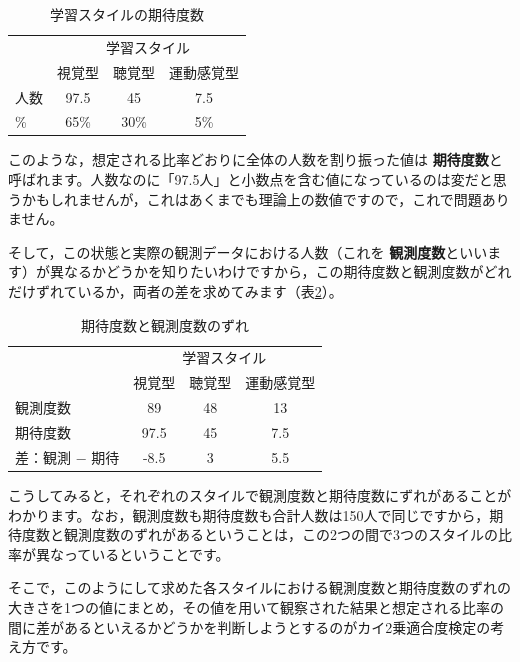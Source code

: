 \documentclass[
  12pt,
  a5jpaper,
  lualatex, ja=standard]{bxjsbook}
\renewcommand{\emph}[1]{\textbf{\color{emph} #1}}
\begin{document}
\begin{table}[H]

\caption{\label{tab:frequencies-chisq-table2}学習スタイルの期待度数}
\centering
\begin{tabular}[t]{lccc}
\toprule
\multicolumn{1}{c}{ } & \multicolumn{3}{c}{学習スタイル} \\
\cmidrule(l{3pt}r{3pt}){2-4}
  & 視覚型 & 聴覚型 & 運動感覚型\\
\midrule
人数 & 97.5 & 45 & 7.5\\
\% & 65\% & 30\% & 5\%\\
\bottomrule
\end{tabular}
\end{table}

このような，想定される比率どおりに全体の人数を割り振った値は\emph{期待度数}と呼ばれます。人数なのに「97.5人」と小数点を含む値になっているのは変だと思うかもしれませんが，これはあくまでも理論上の数値ですので，これで問題ありません。

そして，この状態と実際の観測データにおける人数（これを\emph{観測度数}といいます）が異なるかどうかを知りたいわけですから，この期待度数と観測度数がどれだけずれているか，両者の差を求めてみます（表\ref{tab:frequencies-chisq-table3}）。

\begin{table}[H]

\caption{\label{tab:frequencies-chisq-table3}期待度数と観測度数のずれ}
\centering
\begin{tabular}[t]{lccc}
\toprule
\multicolumn{1}{c}{ } & \multicolumn{3}{c}{学習スタイル} \\
\cmidrule(l{3pt}r{3pt}){2-4}
  & 視覚型 & 聴覚型 & 運動感覚型\\
\midrule
観測度数 & 89 & 48 & 13\\
期待度数 & 97.5 & 45 & 7.5\\
差：観測 − 期待 & -8.5 & 3 & 5.5\\
\bottomrule
\end{tabular}
\end{table}

こうしてみると，それぞれのスタイルで観測度数と期待度数にずれがあることがわかります。なお，観測度数も期待度数も合計人数は150人で同じですから，期待度数と観測度数のずれがあるということは，この2つの間で3つのスタイルの比率が異なっているということです。

そこで，このようにして求めた各スタイルにおける観測度数と期待度数のずれの大きさを1つの値にまとめ，その値を用いて観察された結果と想定される比率の間に差があるといえるかどうかを判断しようとするのがカイ2乗適合度検定の考え方です。
\end{document}
